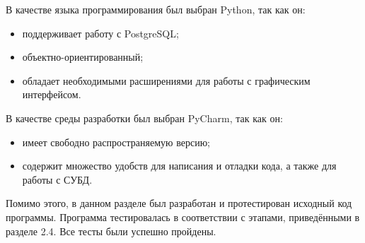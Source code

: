 В качестве языка программирования был выбран Python, так как он:
\begin{itemize}
	\item поддерживает работу с PostgreSQL;
	\item объектно-ориентированный;
	\item обладает необходимыми расширениями для работы с графическим интерфейсом.
\end{itemize}

В качестве среды разработки был выбран PyCharm, так как он:
\begin{itemize}
	\item имеет свободно распространяемую версию;
	\item содержит множество удобств для написания и отладки кода, а также для работы с СУБД.
\end{itemize}

Помимо этого, в данном разделе был разработан и протестирован исходный код программы. Программа тестировалась в соответствии с этапами, приведёнными в разделе 2.4. Все тесты были успешно пройдены.
